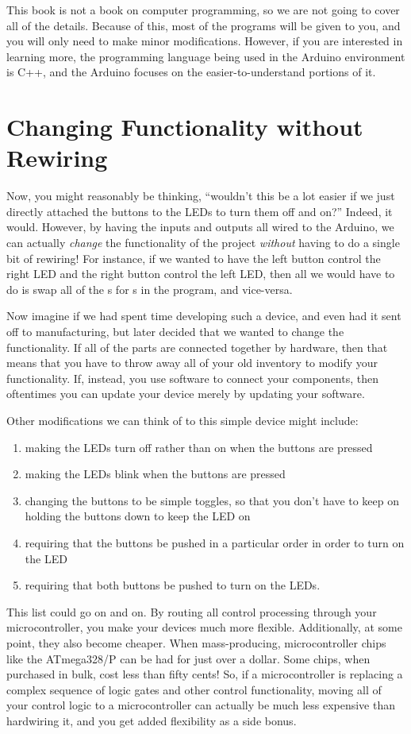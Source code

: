 This book is not a book on computer programming, so we are not going to cover all of the details.
Because of this, most of the programs will be given to you, and you will only need to make minor modifications.
However, if you are interested in learning more, the programming language being used in the Arduino environment is C++, and the Arduino focuses on the easier-to-understand portions of it.

\section{Changing Functionality without Rewiring}

Now, you might reasonably be thinking, ``wouldn't this be a lot easier if we just directly attached the buttons to the LEDs to turn them off and on?''
Indeed, it would. 
However, by having the inputs and outputs all wired to the Arduino, we can actually \emph{change} the functionality of the project \emph{without} having to do a single bit of rewiring!
For instance, if we wanted to have the left button control the right LED and the right button control the left LED, then all we would have to do is swap all of the s for s in the program, and vice-versa.

Now imagine if we had spent time developing such a device, and even had it sent off to manufacturing, but later decided that we wanted to change the functionality.
If all of the parts are connected together by hardware, then that means that you have to throw away all of your old inventory to modify your functionality.
If, instead, you use software to connect your components, then oftentimes you can update your device merely by updating your software.

Other modifications we can think of to this simple device might include:
\begin{enumerate}
\item making the LEDs turn off rather than on when the buttons are pressed
\item making the LEDs blink when the buttons are pressed
\item changing the buttons to be simple toggles, so that you don't have to keep on holding the buttons down to keep the LED on
\item requiring that the buttons be pushed in a particular order in order to turn on the LED
\item requiring that both buttons be pushed to turn on the LEDs.
\end{enumerate}

This list could go on and on.
By routing all control processing through your microcontroller, you make your devices much more flexible.
Additionally, at some point, they also become cheaper.
When mass-producing, microcontroller chips like the ATmega328/P can be had for just over a dollar.
Some chips, when purchased in bulk, cost less than fifty cents!
So, if a microcontroller is replacing a complex sequence of logic gates and other control functionality, moving all of your control logic to a microcontroller can actually be much less expensive than hardwiring it, and you get added flexibility as a side bonus.

